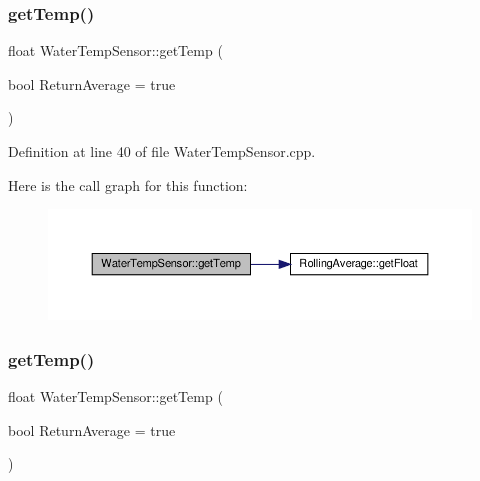 \subsubsection{\texorpdfstring{get\+Temp()}{getTemp()}\hspace{0.1cm}{\footnotesize\ttfamily [1/2]}}
{\footnotesize\ttfamily float Water\+Temp\+Sensor\+::get\+Temp (\begin{DoxyParamCaption}\item[{bool}]{Return\+Average = {\ttfamily true} }\end{DoxyParamCaption})}



Definition at line 40 of file Water\+Temp\+Sensor.\+cpp.

Here is the call graph for this function\+:
\nopagebreak
\begin{figure}[H]
\begin{center}
\leavevmode
\includegraphics[width=350pt]{class_water_temp_sensor_a8643876189e7bbc303bc7f4f7da66f19_cgraph}
\end{center}
\end{figure}
\mbox{\label{class_water_temp_sensor_a8643876189e7bbc303bc7f4f7da66f19}} 
\subsubsection{\texorpdfstring{get\+Temp()}{getTemp()}\hspace{0.1cm}{\footnotesize\ttfamily [2/2]}}
{\footnotesize\ttfamily float Water\+Temp\+Sensor\+::get\+Temp (\begin{DoxyParamCaption}\item[{bool}]{Return\+Average = {\ttfamily true} }\end{DoxyParamCaption})}

\mbox{\label{class_water_temp_sensor_a812f3e2f65426efdf594e599d0e8a24d}} 
